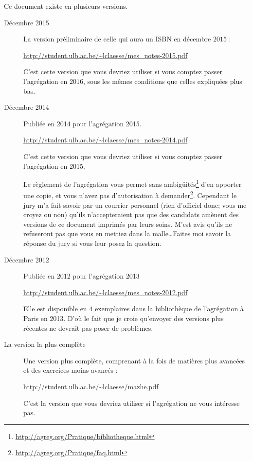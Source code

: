 
\thispagestyle{empty}

Ce document existe en plusieurs versions.
\begin{description}
    \item[Décembre 2015]

        La version préliminaire de celle qui aura un ISBN en décembre $2015$ :
        \begin{center}
            \url{http://student.ulb.ac.be/~lclaesse/mes_notes-2015.pdf}
        \end{center}

        C'est cette version que vous devriez utiliser si vous comptez passer l'agrégation en $2016$, sous les mêmes conditions que celles expliquées plus bas.

    \item[Décembre 2014] 

        Publiée en 2014 pour l'agrégation 2015.
        \begin{center}
        \url{http://student.ulb.ac.be/~lclaesse/mes_notes-2014.pdf}
        \end{center}

        C'est cette version que vous devriez utiliser si vous comptez passer l'agrégation en $2015$.
        
        Le règlement de l'agrégation vous permet sans ambigüités\footnote{\url{http://agreg.org/Pratique/bibliotheque.html}} d'en apporter une copie, et vous n'avez pas d'autorisation à demander\footnote{\url{http://agreg.org/Pratique/faq.html}}. Cependant le jury m'a fait savoir par un courrier personnel (rien d'officiel donc; vous me croyez ou non) qu'ils n'accepteraient pas que des candidats amènent des versions de ce document imprimés par leurs soins. M'est avis qu'ils ne refuseront pas que vous en mettiez dans la malle\ldots Faites moi savoir la réponse du jury si vous leur posez la question.


    \item[Décembre 2012]

        Publiée en 2012 pour l'agrégation 2013
        \begin{center}
        \url{http://student.ulb.ac.be/~lclaesse/mes_notes-2012.pdf}
        \end{center}

        Elle est disponible en \( 4\) exemplaires dans la bibliothèque de l'agrégation à Paris en 2013. D'où le fait que je croie qu'envoyer des versions plus récentes ne devrait pas poser de problèmes.

    \item[La version la plus complète]

        Une version plus complète, comprenant à la fois de matières plus avancées et des exercices moins avancés : 
        \begin{center}
        \url{http://student.ulb.ac.be/~lclaesse/mazhe.pdf}
        \end{center}

        C'est la version que vous devriez utiliser si l'agrégation ne vous intéresse pas.

\end{description}


\vfill

\LogoEtLicence
\clearpage
